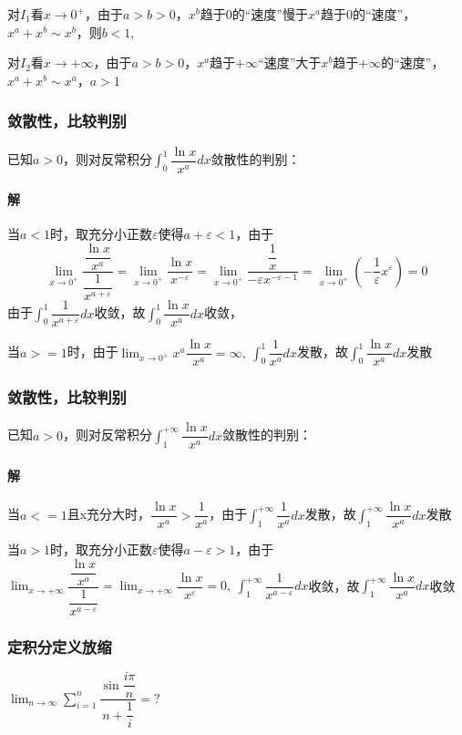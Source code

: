 对\(I_1\)看\(x \to 0^+\)，由于\(a > b > 0\)，\(x^b\)趋于0的“速度”慢于\(x^a\)趋于0的“速度”，\(x^a + x^b \sim x^b\)，则\(b < 1\),

对\(I_2\)看\(x \to +\infty\)，由于\(a > b > 0\)，\(x^a\)趋于\(+\infty\)“速度”大于\(x^b\)趋于\(+\infty\)的“速度”，\(x^a + x^b \sim x^a\)，\(a > 1\)


\subsubsection{敛散性，比较判别}
已知\(a > 0\)，则对反常积分\(\displaystyle\int_0^1\dfrac{\ln x}{x^a}dx\)敛散性的判别：

\paragraph{解}
当\(a < 1\)时，取充分小正数\(\varepsilon\)使得\(a + \varepsilon < 1\)，由于\[\lim_{x \to 0^+}\dfrac{\dfrac{\ln x}{x^a}}{\dfrac{1}{x^{a + \varepsilon}}} = \lim_{x \to 0^+}\dfrac{\ln x}{x^{-\varepsilon}} = \lim_{x \to 0^+}\dfrac{\dfrac{1}{x}}{-\varepsilon x^{-\varepsilon - 1}} = \lim_{x \to 0^+}(-\dfrac{1}{\varepsilon}x^\varepsilon) = 0\]
由于\(\int_0^1\dfrac{1}{x^{a + \varepsilon}}dx\)收敛，故\(\int_0^1\dfrac{\ln x}{x^a}dx\)收敛，

当\(a >= 1\)时，由于\(\lim_{x \to 0^+}x^a\dfrac{\ln x}{x^a} = \infty,\ \int_0^1\dfrac{1}{x^a}dx\)发散，故\(\int_0^1\dfrac{\ln x}{x^a}dx\)发散


\subsubsection{敛散性，比较判别}
已知\(a > 0\)，则对反常积分\(\displaystyle\int_1^{+\infty}\dfrac{\ln x}{x^a}dx\)敛散性的判别：

\paragraph{解}
当\(a <= 1\)且x充分大时，\(\dfrac{\ln x}{x^a} > \dfrac{1}{x^a}\)，由于\(\int_1^{+\infty}\dfrac{1}{x^a}dx\)发散，故\(\int_1^{+\infty}\dfrac{\ln x}{x^a}dx\)发散

当\(a > 1\)时，取充分小正数\(\varepsilon\)使得\(a - \varepsilon > 1\)，由于\(\lim_{x \to +\infty}\dfrac{\dfrac{\ln x}{x^a}}{\dfrac{1}{x^{a - \varepsilon}}} = \lim_{x \to +\infty}\dfrac{\ln x}{x^\varepsilon} = 0,\ \int_1^{+\infty}\dfrac{1}{x^{a - \varepsilon}}dx\)收敛，故\(\int_1^{+\infty}\dfrac{\ln x}{x^a}dx\)收敛


\subsubsection{定积分定义放缩}
\(\displaystyle\lim_{n \to \infty}\sum_{i = 1}^n\dfrac{\sin\dfrac{i\pi}{n}}{n + \dfrac{1}{i}} = ?\)

